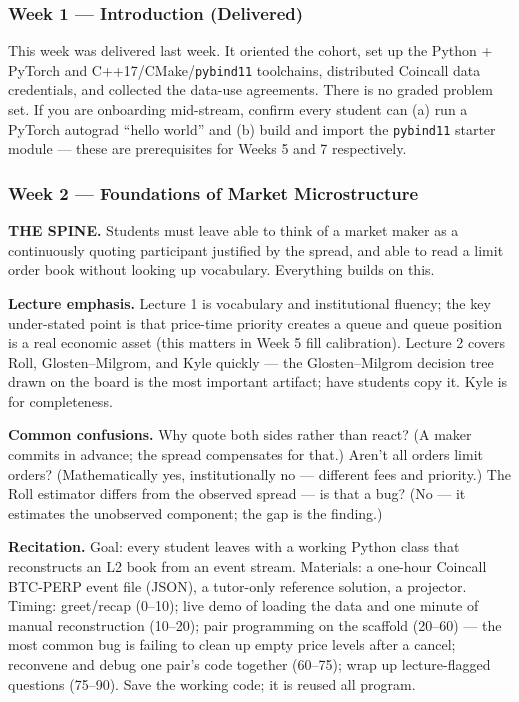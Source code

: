 \documentclass[
]{article}
\begin{document}
\subsubsection{Week 1 --- Introduction
(Delivered)}\label{week-1-introduction-delivered}

This week was delivered last week. It oriented the cohort, set up the
Python + PyTorch and C++17/CMake/\texttt{pybind11} toolchains,
distributed Coincall data credentials, and collected the data-use
agreements. There is no graded problem set. If you are onboarding
mid-stream, confirm every student can (a) run a PyTorch autograd ``hello
world'' and (b) build and import the \texttt{pybind11} starter module
--- these are prerequisites for Weeks 5 and 7 respectively.

\subsubsection{Week 2 --- Foundations of Market
Microstructure}\label{week-2-foundations-of-market-microstructure}

\textbf{THE SPINE.} Students must leave able to think of a market maker
as a continuously quoting participant justified by the spread, and able
to read a limit order book without looking up vocabulary. Everything
builds on this.

\textbf{Lecture emphasis.} Lecture 1 is vocabulary and institutional
fluency; the key under-stated point is that price-time priority creates
a queue and queue position is a real economic asset (this matters in
Week 5 fill calibration). Lecture 2 covers Roll, Glosten--Milgrom, and
Kyle quickly --- the Glosten--Milgrom decision tree drawn on the board
is the most important artifact; have students copy it. Kyle is for
completeness.

\textbf{Common confusions.} Why quote both sides rather than react? (A
maker commits in advance; the spread compensates for that.) Aren't all
orders limit orders? (Mathematically yes, institutionally no ---
different fees and priority.) The Roll estimator differs from the
observed spread --- is that a bug? (No --- it estimates the unobserved
component; the gap is the finding.)

\textbf{Recitation.} Goal: every student leaves with a working Python
class that reconstructs an L2 book from an event stream. Materials: a
one-hour Coincall BTC-PERP event file (JSON), a tutor-only reference
solution, a projector. Timing: greet/recap (0--10); live demo of loading
the data and one minute of manual reconstruction (10--20); pair
programming on the scaffold (20--60) --- the most common bug is failing
to clean up empty price levels after a cancel; reconvene and debug one
pair's code together (60--75); wrap up lecture-flagged questions
(75--90). Save the working code; it is reused all program.
\end{document}

